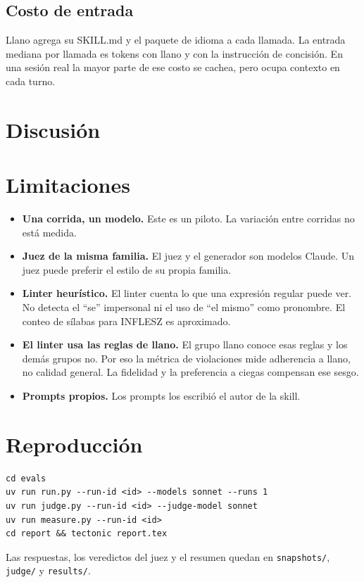 \documentclass[11pt,a4paper]{article}
\begin{document}
\begin{table}[H]
\centering
\small

\caption{Comparaciones a ciegas, en número de prompts.}
\end{table}

\subsection{Costo de entrada}

Llano agrega su SKILL.md y el paquete de idioma a cada llamada. La entrada mediana por llamada es \llanoInputTokens{} tokens con llano y \terseInputTokens{} con la instrucción de concisión. En una sesión real la mayor parte de ese costo se cachea, pero ocupa contexto en cada turno.

\section{Discusión}



\section{Limitaciones}

\begin{itemize}
  \item \textbf{Una corrida, un modelo.} Este es un piloto. La variación entre corridas no está medida.
  \item \textbf{Juez de la misma familia.} El juez y el generador son modelos Claude. Un juez puede preferir el estilo de su propia familia.
  \item \textbf{Linter heurístico.} El linter cuenta lo que una expresión regular puede ver. No detecta el ``se'' impersonal ni el uso de ``el mismo'' como pronombre. El conteo de sílabas para INFLESZ es aproximado.
  \item \textbf{El linter usa las reglas de llano.} El grupo llano conoce esas reglas y los demás grupos no. Por eso la métrica de violaciones mide adherencia a llano, no calidad general. La fidelidad y la preferencia a ciegas compensan ese sesgo.
  \item \textbf{Prompts propios.} Los prompts los escribió el autor de la skill.
\end{itemize}

\section{Reproducción}

\begin{verbatim}
cd evals
uv run run.py --run-id <id> --models sonnet --runs 1
uv run judge.py --run-id <id> --judge-model sonnet
uv run measure.py --run-id <id>
cd report && tectonic report.tex
\end{verbatim}

Las respuestas, los veredictos del juez y el resumen quedan en \texttt{snapshots/}, \texttt{judge/} y \texttt{results/}.
\end{document}
